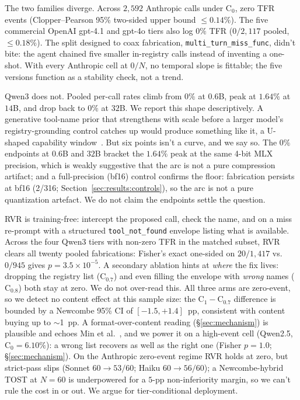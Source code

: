 The two families diverge. Across $2{,}592$ Anthropic calls
under $\mathrm{C}_0$, zero TFR events (Clopper--Pearson 95\% two-sided
upper bound $\leq\!0.14\%$). The five commercial OpenAI gpt-4.1 and gpt-4o
tiers also log $0\%$ TFR ($0/2{,}117$ pooled, $\leq\!0.18\%$). The split
designed to coax fabrication, \texttt{multi\_turn\_miss\_func}, didn't
bite: the agent chained five smaller in-registry calls instead of
inventing a one-shot. With every Anthropic cell at $0/N$, no temporal
slope is fittable; the five versions function as a stability check, not
a trend.

Qwen3 does not. Pooled per-call rates climb from
$0\%$ at $0.6$B, peak at $\mathbf{1.64\%}$ at $14$B, and drop back to
$0\%$ at $32$B. We report this shape descriptively. A generative
tool-name prior that strengthens with scale before a larger model's
registry-grounding control catches up would produce something like it, a
U-shaped capability
window~\citep{wei2022ushaped,mckenzie2023inversescaling}. But six
points isn't a curve, and we say so. The $0\%$ endpoints at $0.6$B and
$32$B bracket the $1.64\%$ peak at the same 4-bit MLX precision, which
is weakly suggestive that the arc is not a pure compression artifact;
and a full-precision (bf16) control confirms the floor: fabrication
persists at bf16 (2/316; Section~\ref{sec:results:controls}), so the arc
is not a pure quantization artefact. We do not claim the
endpoints settle the question.

RVR is training-free: intercept the proposed call, check
the name, and on a miss re-prompt with a structured
\texttt{tool\_not\_found} envelope listing what is available. Across
the four Qwen3 tiers with non-zero TFR in the matched subset, RVR clears
all twenty pooled fabrications: Fisher's exact one-sided on $20/1{,}417$
vs.\ $0/945$ gives $p=3.5\!\times\!10^{-5}$. A secondary ablation hints
at \emph{where} the fix lives: dropping the registry list
($\mathrm{C}_{0.7}$) and even filling the envelope with \emph{wrong}
names ($\mathrm{C}_{0.8}$) both stay at zero. We do not over-read this.
All three arms are zero-event, so we detect no content effect at this
sample size: the $\mathrm{C}_1\!-\!\mathrm{C}_{0.7}$ difference is
bounded by a Newcombe 95\% CI of $[-1.5, +1.4]$~pp, consistent with
content buying up to $\sim$1~pp. A format-over-content reading
(\S\ref{sec:mechanism}) is plausible and echoes
Min et al.~\citep{min2022rethinking}, and we power it on a high-event cell (Qwen2.5,
$\mathrm{C}_0=6.10\%$): a wrong list recovers as well as the right one
(Fisher $p=1.0$; \S\ref{sec:mechanism}). On the
Anthropic zero-event regime RVR holds at zero, but strict-pass slips
(Sonnet $60\!\to\!53/60$; Haiku $60\!\to\!56/60$); a Newcombe-hybrid
TOST at $N\!=\!60$ is underpowered for a $5$-pp non-inferiority margin,
so we can't rule the cost in or out. We argue for tier-conditional
deployment.

